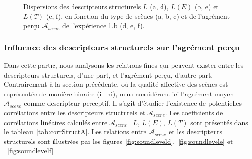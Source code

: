 \documentclass[twoside,twocolumn]{article}
\begin{document}
\begin{figure}[t]
       \caption{Dispersions des descripteurs structurels $L$ (a, d), $L(E)$ (b, e) et $L(T)$ (c, f), en fonction du type de scènes (a, b, c) et de l'agrément perçu $\mathcal{A}_{scene}$ de l'expérience 1.b (d, e, f).}
\end{figure}

\subsubsection*{Influence des descripteurs structurels sur l'agrément perçu}

Dans cette partie, nous analysons les relations fines qui peuvent exister entre les descripteurs structurels, d'une part, et l'agrément perçu, d'autre part. Contrairement à la section précédente, où la qualité affective des scènes est représentée de manière binaire (i \vs~ni), nous considérons ici l'agrément moyen $\mathcal{A}_{scene}$ comme descripteur perceptif. Il s'agit d'étudier l'existence de potentielles corrélations entre les descripteurs structurels et $\mathcal{A}_{scene}$. Les coefficients de corrélations linéaires calculés entre $\mathcal{A}_{scene}$ \vs~$L$, $L(E)$, $L(T)$ sont présentés dans le tableau~\ref{tab:corrStructA}. Les relations entre $\mathcal{A}_{scene}$ et les descripteurs structurels sont illustrées par les figures~\ref{fig:soundleveld},~\ref{fig:soundlevele} et ~\ref{fig:soundlevelf}. 
\end{document}
